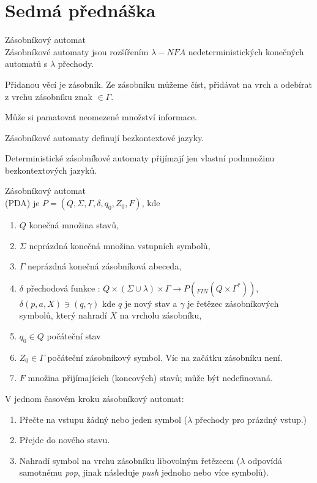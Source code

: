 \documentclass[../main.tex]{subfiles}
\begin{document}
\section{Sedmá přednáška}

    Zásobníkový automat\\

    Zásobníkové automaty jsou rozšířením $\lambda -NFA$ nedeterministických konečných
    automatů s $\lambda$ přechody.

    Přidanou věcí je zásobník. Ze zásobníku můžeme číst, přidávat na vrch a odebírat
    z vrchu zásobníku znak $\in \Gamma$.

    Může si pamatovat neomezené množství informace.

    Zásobníkové automaty definují bezkontextové jazyky.

    Deterministické zásobníkové automaty přijímají jen vlastní podmnožinu bezkontextových jazyků.

    \begin{definition}
        Zásobníkový automat\\

        (PDA) je $P = (Q, \Sigma, \Gamma, \delta, q_0, Z_0, F)$, kde 
        \begin{enumerate}
            \item $Q$ konečná množina stavů,
            \item $\Sigma$ neprázdná konečná množina vstupních symbolů,
            \item $\Gamma$ neprázdná konečná zásobníková abeceda,
            \item $\delta$ přechodová funkce : $Q \times (\Sigma \cup {\lambda})
            \times \Gamma \rightarrow P(_{FIN}(Q\times \Gamma^*))$, $\delta (p,a,X) \ni (q,\gamma)$
            kde $q$ je nový stav a $\gamma$ je řetězec zásobníkových symbolů, který nahradí $X$ na vrcholu zásobníku,
            \item $q_0 \in Q$ počáteční stav
            \item $Z_0 \in \Gamma$ počáteční zásobníkový symbol. Víc na začátku zásobníku není.
            \item $F$ množina přijímajícich (koncových) stavů; může být nedefinovaná.
        \end{enumerate}

        V jednom časovém kroku zásobníkový automat:
        \begin{enumerate}
            \item Přečte na vstupu žádný nebo jeden symbol ($\lambda$ přechody pro prázdný vstup.)
            \item Přejde do nového stavu.
            \item Nahradí symbol na vrchu zásobníku libovolným řetězcem ($\lambda$ odpovídá samotnému \textit{pop},
            jinak následuje \textit{push} jednoho nebo více symbolů).
        \end{enumerate}
    \end{definition}
\end{document}
